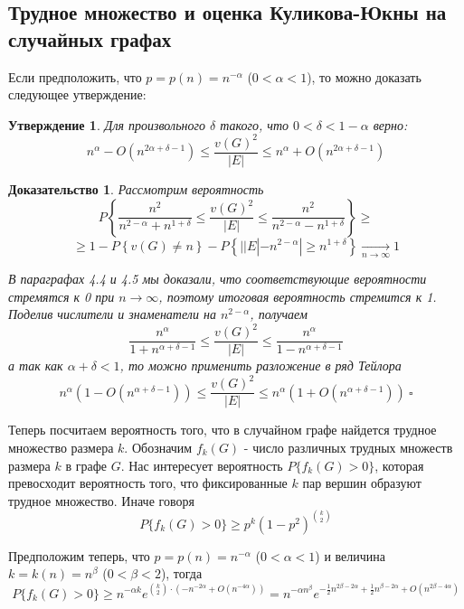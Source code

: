 \documentclass[a4paper]{article}
\newtheorem*{msolution}{Доказательство}
\newtheorem{mclaim}{Утверждение}[section]
\begin{document}
\subsection{Трудное множество и оценка Куликова-Юкны на случайных графах}

Если предположить, что $p = p(n) = n^{-\alpha}$ ($0 < \alpha < 1$), то можно доказать следующее утверждение:
\begin{mclaim}
	Для произвольного $\delta$ такого, что $0 < \delta < 1 - \alpha$  верно:
    $$n^{\alpha} - O(n^{2\alpha + \delta - 1}) \leq \frac{v(G)^2}{|E|} \leq n^{\alpha} + O(n^{2\alpha + \delta - 1})$$
\end{mclaim}

\begin{msolution}
   Рассмотрим вероятность 
   $$P\left\{\frac{n^2}{n^{2-\alpha} + n^{1+\delta}} \leq \frac{v(G)^2}{|E|} \leq \frac{n^2}{n^{2-\alpha} - n^{1+\delta}} \right\}
    \geq $$ $$ \geq 1 - P\left\{v(G) \neq n\right\} - P\left\{||E| - n^{2-\alpha}| \geq
n^{1+\delta}\right\} \xrightarrow[n \to \infty]{} 1$$

В параграфах 4.4 и 4.5 мы доказали, что соответствующие вероятности стремятся к 0 при $n \to \infty$, 
поэтому итоговая вероятность стремится к 1. Поделив числители и знаменатели на $n^{2-\alpha}$, получаем 
$$\frac{n^{\alpha}}{1 + n^{\alpha + \delta - 1}} \leq \frac{v(G)^2}{|E|} \leq \frac{n^{\alpha}}{1 - n^{\alpha + \delta - 1}}$$
а так как $\alpha + \delta < 1$, то можно применить разложение в ряд Тейлора
$$n^{\alpha}\left(1 - O(n^{\alpha + \delta - 1})\right) \leq \frac{v(G)^2}{|E|} \leq n^{\alpha}\left(1 + O(n^{\alpha + \delta - 1})\right)\ \square$$
\end{msolution}

Теперь посчитаем вероятность того, что в случайном графе найдется трудное множество размера $k$. 
Обозначим $f_k(G)$ - число различных трудных множеств размера $k$ в графе $G$. Нас интересует 
вероятность $P\{f_k(G) > 0\}$, которая превосходит вероятность того, что фиксированные $k$ пар 
вершин образуют трудное множество. Иначе говоря $$P\{f_k(G) > 0\} \geq p^k\left(1-p^2\right)^{\binom{k}{2}}$$

Предположим теперь, что $p = p(n) = n^{-\alpha}$ ($0 < \alpha < 1$) и величина $k = k(n) = n^{\beta}$ ($0 < \beta < 2$), тогда $$P\{f_k(G) > 0\} \geq 
n^{-\alpha k}e^{\binom{k}{2}\cdot(-n^{-2\alpha} + O(n^{-4\alpha}))} = n^{-\alpha n^{\beta}} 
e^{-\frac{1}{2}n^{2\beta-2\alpha} + \frac{1}{2}n^{\beta - 2\alpha} + O(n^{2\beta - 4\alpha})}$$
\end{document}
